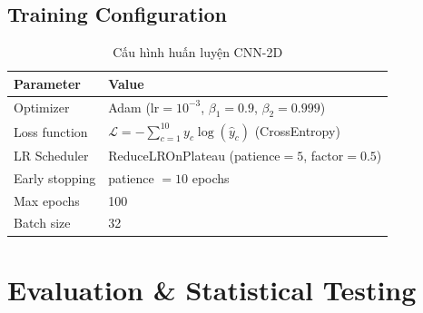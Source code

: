 \documentclass[12pt,a4paper]{article}
\begin{document}
\subsection{Training Configuration}

\begin{table}[H]
\centering
\caption{Cấu hình huấn luyện CNN-2D}
\begin{tabular}{@{}ll@{}}
\toprule
\textbf{Parameter} & \textbf{Value} \\
\midrule
Optimizer       & Adam ($\text{lr} = 10^{-3}$, $\beta_1 = 0.9$, $\beta_2 = 0.999$) \\
Loss function   & $\mathcal{L} = -\sum_{c=1}^{10} y_c \log(\hat{y}_c)$ \quad (CrossEntropy) \\
LR Scheduler    & ReduceLROnPlateau (patience$=5$, factor$=0.5$) \\
Early stopping  & patience $= 10$ epochs \\
Max epochs      & 100 \\
Batch size      & 32 \\
\bottomrule
\end{tabular}
\end{table}


\section{Evaluation \& Statistical Testing}
\end{document}
